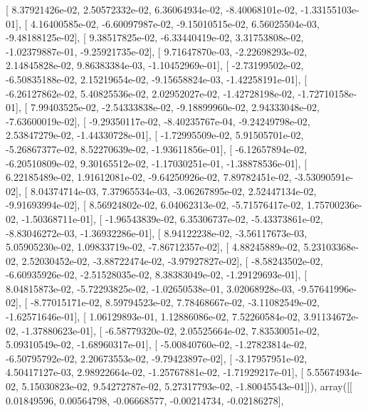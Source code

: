 \documentclass{article}
\begin{document}
       [  8.37921426e-02,   2.50572332e-02,   6.36064934e-02,
         -8.40068101e-02,  -1.33155103e-01],
       [  4.16400585e-02,  -6.60097987e-02,  -9.15010515e-02,
          6.56025504e-03,  -9.48188125e-02],
       [  9.38517825e-02,  -6.33440419e-02,   3.31753808e-02,
         -1.02379887e-01,  -9.25921735e-02],
       [  9.71647870e-03,  -2.22698293e-02,   2.14845828e-02,
          9.86383384e-03,  -1.10452969e-01],
       [ -2.73199502e-02,  -6.50835188e-02,   2.15219654e-02,
         -9.15658824e-03,  -1.42258191e-01],
       [ -6.26127862e-02,   5.40825536e-02,   2.02952027e-02,
         -1.42728198e-02,  -1.72710158e-01],
       [  7.99403525e-02,  -2.54333838e-02,  -9.18899960e-02,
          2.94333048e-02,  -7.63600019e-02],
       [ -9.29350117e-02,  -8.40235767e-04,  -9.24249798e-02,
          2.53847279e-02,  -1.44330728e-01],
       [ -1.72995509e-02,   5.91505701e-02,  -5.26867377e-02,
          8.52270639e-02,  -1.93611856e-01],
       [ -6.12657894e-02,  -6.20510809e-02,   9.30165512e-02,
         -1.17030251e-01,  -1.38878536e-01],
       [  6.22185489e-02,   1.91612081e-02,  -9.64250926e-02,
          7.89782451e-02,  -3.53090591e-02],
       [  8.04374714e-03,   7.37965534e-03,  -3.06267895e-02,
          2.52447134e-02,  -9.91693994e-02],
       [  8.56924802e-02,   6.04062313e-02,  -5.71576417e-02,
          1.75700236e-02,  -1.50368711e-01],
       [ -1.96543839e-02,   6.35306737e-02,  -5.43373861e-02,
         -8.83046272e-03,  -1.36932286e-01],
       [  8.94122238e-02,  -3.56117673e-03,   5.05905230e-02,
          1.09833719e-02,  -7.86712357e-02],
       [  4.88245889e-02,   5.23103368e-02,   2.52030452e-02,
         -3.88722474e-02,  -3.97927827e-02],
       [ -8.58243502e-02,  -6.60935926e-02,  -2.51528035e-02,
          8.38383049e-02,  -1.29129693e-01],
       [  8.04815873e-02,  -5.72293825e-02,  -1.02650538e-01,
          3.02068928e-03,  -9.57641996e-02],
       [ -8.77015171e-02,   8.59794523e-02,   7.78468667e-02,
         -3.11082549e-02,  -1.62571646e-01],
       [  1.06129893e-01,   1.12886086e-02,   7.52260584e-02,
          3.91134672e-02,  -1.37880623e-01],
       [ -6.58779320e-02,   2.05525664e-02,   7.83530051e-02,
          5.09310549e-02,  -1.68960317e-01],
       [ -5.00840760e-02,  -1.27823814e-02,  -6.50795792e-02,
          2.20673553e-02,  -9.79423897e-02],
       [ -3.17957951e-02,   4.50417127e-03,   2.98922664e-02,
         -1.25767881e-02,  -1.71929217e-01],
       [  5.55674934e-02,   5.15030823e-02,   9.54272787e-02,
          5.27317793e-02,  -1.80045543e-01]]), array([[ 0.01849596,  0.00564798, -0.06668577, -0.00214734, -0.02186278],
\end{document}
